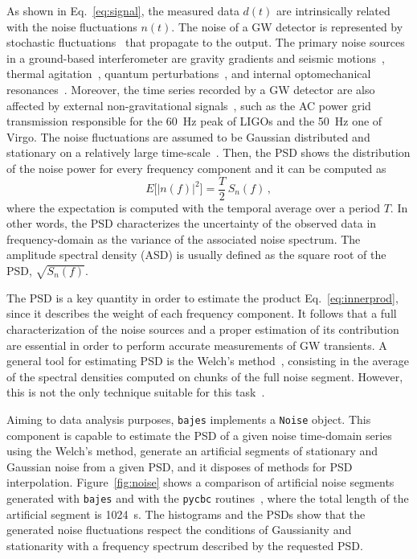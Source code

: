 \documentclass[prd,aps,twocolumn,a4paper,showkeys,nofootinbib,floatfix]{revtex4-1}
\newcommand{\be}{\begin{equation}}
\newcommand{\ee}{\end{equation}}
\newcommand{\bajes}{{\tt bajes}}
\begin{document}
As shown in Eq.~\eqref{eq:signal}, the measured data $d(t)$ are
intrinsically related with the noise fluctuations $n(t)$.
The noise of a GW detector is represented by
stochastic fluctuations~\cite{LIGOScientific:2019hgc} 
that propagate to the output.
The primary noise sources in a ground-based interferometer
are gravity gradients and seismic motions~\cite{Losurdo:2001bi,Daw:2004qd,Accadia:2011dg}, 
thermal agitation~\cite{Harry:2001iw,Somiya:2011np}, 
quantum perturbations~\cite{Lyons:00,Buonanno:2003ch},
and internal optomechanical resonances~\cite{Nachman,Bond:2017}.
Moreover, 
the time series recorded by a GW detector are also affected 
by external non-gravitational signals~\cite{Cirone:2018guh},
such as the AC power grid transmission 
responsible for the 60~Hz peak of LIGOs 
and the 50~Hz one of Virgo.
The noise fluctuations are assumed to be Gaussian distributed 
and stationary on a relatively large time-scale~\cite{LIGOScientific:2019hgc}.
Then, the PSD shows the distribution of the noise power for every frequency component 
and
it can be computed as
\be
\label{eq:psd}
 E\Big[|n(f)|^2  \Big]  = \frac{T}{2} \,S_n(f)\,,
\ee
where the expectation is computed with the temporal average over 
a period $T$.
In other words, the PSD characterizes the uncertainty of the observed data
in frequency-domain as the variance of the associated noise spectrum.
The amplitude spectral density (ASD) is usually defined as the square
root of the PSD, $\sqrt{S_n(f)}$.

The PSD is a key quantity in order to estimate the product Eq.~\eqref{eq:innerprod},
since it describes the weight of each frequency component.
It follows that a full characterization of the noise sources 
and a proper estimation of its contribution 
are essential in order to perform accurate measurements of GW transients.
A general tool for estimating PSD is the Welch's method~\cite{Welch:67}, consisting in the 
average of the spectral densities computed on chunks of the full noise segment.
However, this is not the only technique suitable for this task~\cite{Blais:1996, Cornish:2014kda}.

Aiming to data analysis purposes, 
{\bajes} implements a {\tt Noise} object.
This component is
capable to estimate the PSD of a given noise time-domain 
series using the Welch's method,
generate an artificial segments of stationary and Gaussian noise from a given PSD,
and it disposes of methods for PSD interpolation.
Figure~\ref{fig:noise} shows a comparison of artificial noise segments 
generated with {\tt bajes} 
and with the {\tt pycbc}
routines~\cite{Usman:2015kfa,Biwer:2018osg,Nitz:2018rgo, alex_nitz_2021_4556907},
where the total length of the artificial segment is 1024~s. 
The histograms and the PSDs 
show that the generated noise fluctuations respect the conditions of 
Gaussianity and stationarity with a frequency spectrum described 
by the requested PSD.
\end{document}
